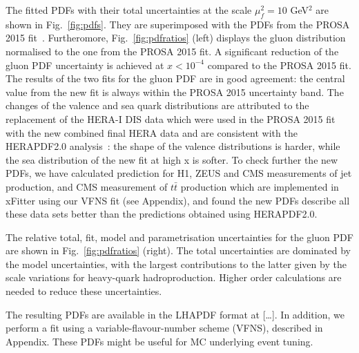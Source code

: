 \documentclass[12pt]{article}
\begin{document}
The fitted PDFs with their total uncertainties at the scale $\mu^2_f=10$ GeV$^2$ are shown in Fig.~\ref{fig:pdfs}. They are superimposed with the PDFs from the PROSA 2015 fit~\cite{Zenaiev:2015rfa}. Furtheromore, Fig.~\ref{fig:pdfratios} (left) displays the gluon distribution normalised to the one from the PROSA 2015 fit. 
A significant reduction of the gluon PDF uncertainty is achieved at $x < 10^{-4}$ compared to the PROSA 2015 fit. 
The results of the two fits for the gluon PDF are in good agreement: the central value from the new fit is always within the PROSA 2015 uncertainty band. 
The changes of the valence and sea quark distributions are attributed to the replacement of the HERA-I DIS data which were used in the PROSA 2015 fit with the new combined final HERA data and are consistent with the HERAPDF2.0 analysis~\cite{Abramowicz:2015mha}: the shape of the valence distributions is harder, while the sea distribution of the new fit at high x is softer. 
To check further the new PDFs, we have calculated prediction for H1, ZEUS and CMS measurements of jet production, and CMS measurement of $t\bar{t}$ production which are implemented in xFitter using our VFNS fit (see Appendix), and found the new PDFs describe all these data sets better than the predictions obtained using HERAPDF2.0.

The relative total, fit, model and parametrisation uncertainties for the gluon PDF are shown in Fig.~\ref{fig:pdfratios} (right). The total uncertainties are dominated by the model uncertainties, with the largest contributions to the latter given by the scale variations for heavy-quark hadroproduction. Higher order calculations are needed to reduce these uncertainties.

The resulting PDFs are available in the LHAPDF format at [\dots].
In addition, we perform a fit using a variable-flavour-number scheme (VFNS), described in Appendix. These PDFs might be useful for MC underlying event tuning.
\end{document}
